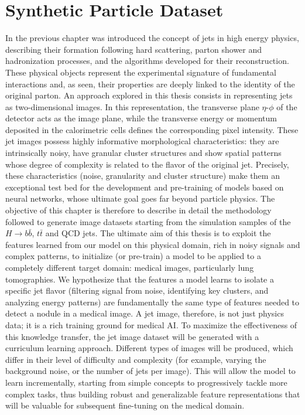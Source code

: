 \chapter{Synthetic Particle Dataset}
\label{cap:jets}

In the previous chapter was introduced the concept of jets in high energy physics, describing their formation following hard scattering, parton shower and hadronization processes, and the algorithms developed for their reconstruction. These physical objects represent the experimental signature of fundamental interactions and, as seen, their properties are deeply linked to the identity of the original parton.
An approach explored in this thesis consists in representing jets as two-dimensional images. In this representation, the transverse plane $\eta$-$\phi$ of the detector acts as the image plane, while the transverse energy or momentum deposited in the calorimetric cells defines the corresponding pixel intensity.
These jet images possess highly informative morphological characteristics: they are intrinsically noisy, have granular cluster structures and show spatial patterns whose degree of complexity is related to the flavor of the original jet. Precisely, these characteristics (noise, granularity and cluster structure) make them an exceptional test bed for the development and pre-training of models based on neural networks, whose ultimate goal goes far beyond particle physics.
The objective of this chapter is therefore to describe in detail the methodology followed to generate image datasets starting from the simulation samples of the $H \to b\bar{b}$, $t\bar{t}$ and QCD jets.  
The ultimate aim of this thesis is to exploit the features learned from our model on this physical domain, rich in noisy signals and complex patterns, to initialize (or pre-train) a model to be applied to a completely different target domain: medical images, particularly lung tomographies.
We hypothesize that the features a model learns to isolate a specific jet flavor (filtering signal from noise, identifying key clusters, and analyzing energy patterns) are fundamentally the same type of features needed to detect a nodule in a medical image. A jet image, therefore, is not just physics data; it is a rich training ground for medical AI.
To maximize the effectiveness of this knowledge transfer, the jet image dataset will be generated with a curriculum learning approach. Different types of images will be produced, which differ in their level of difficulty and complexity (for example, varying the background noise, or the number of jets per image).
This will allow the model to learn incrementally, starting from simple concepts to progressively tackle more complex tasks, thus building robust and generalizable feature representations that will be valuable for subsequent fine-tuning on the medical domain.


